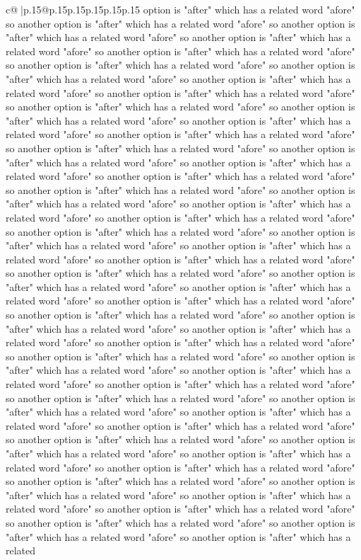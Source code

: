 \documentclass{article}
\begin{document}
{\begin{supertabular}{c@{$\;$}|p{.15\linewidth}@{}p{.15\linewidth}p{.15\linewidth}p{.15\linewidth}p{.15\linewidth}p{.15\linewidth}}
{{{option is "after" which has a related word "afore" so another option is "after" which has a related word "afore" so another option is "after" which has a related word "afore" so another option is "after" which has a related word "afore" so another option is "after" which has a related word "afore" so another option is "after" which has a related word "afore" so another option is "after" which has a related word "afore" so another option is "after" which has a related word "afore" so another option is "after" which has a related word "afore" so another option is "after" which has a related word "afore" so another option is "after" which has a related word "afore" so another option is "after" which has a related word "afore" so another option is "after" which has a related word "afore" so another option is "after" which has a related word "afore" so another option is "after" which has a related word "afore" so another option is "after" which has a related word "afore" so another option is "after" which has a related word "afore" so another option is "after" which has a related word "afore" so another option is "after" which has a related word "afore" so another option is "after" which has a related word "afore" so another option is "after" which has a related word "afore" so another option is "after" which has a related word "afore" so another option is "after" which has a related word "afore" so another option is "after" which has a related word "afore" so another option is "after" which has a related word "afore" so another option is "after" which has a related word "afore" so another option is "after" which has a related word "afore" so another option is "after" which has a related word "afore" so another option is "after" which has a related word "afore" so another option is "after" which has a related word "afore" so another option is "after" which has a related word "afore" so another option is "after" which has a related word "afore" so another option is "after" which has a related word "afore" so another option is "after" which has a related word "afore" so another option is "after" which has a related word "afore" so another option is "after" which has a related word "afore" so another option is "after" which has a related word "afore" so another option is "after" which has a related word "afore" so another option is "after" which has a related word "afore" so another option is "after" which has a related word "afore" so another option is "after" which has a related word "afore" so another option is "after" which has a related word "afore" so another option is "after" which has a related word "afore" so another option is "after" which has a related word "afore" so another option is "after" which has a related word "afore" so another option is "after" which has a related word "afore" so another option is "after" which has a related word "afore" so another option is "after" which has a related word "afore" so another option is "after" which has a related word "afore" so another option is "after" which has a related word "afore" so another option is "after" which has a related word "afore" so another option is "after" which has a related }}}
\end{supertabular}}
\end{document}
